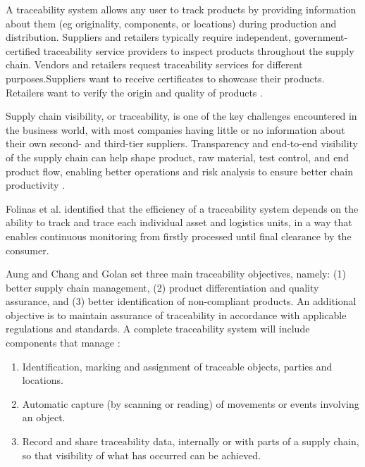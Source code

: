 A traceability system allows any user to track products by providing information about them (eg originality, components, or locations) during production and distribution. Suppliers and retailers typically require independent, government-certified traceability service providers to inspect products throughout the supply chain. Vendors and retailers request traceability services for different purposes.Suppliers want to receive certificates to showcase their products. Retailers want to verify the origin and quality of products \cite{lu2017adaptable}.

Supply chain visibility, or traceability, is one of the key challenges encountered in the business world, with most companies having little or no information about their own second- and third-tier suppliers. Transparency and end-to-end visibility of the supply chain can help shape product, raw material, test control, and end product flow, enabling better operations and risk analysis to ensure better chain productivity \cite{abeyratne2016blockchain}.

Folinas et al. \cite{folinas2006traceability} identified that the efficiency of a traceability system depends on the ability to track and trace each individual asset and logistics units, in a way that enables continuous monitoring from firstly processed until final clearance by the consumer.

Aung and Chang \cite{aung2014traceability} and Golan \cite{golan2004traceability} set three main traceability objectives, namely: (1) better supply chain management, (2) product differentiation and quality assurance, and (3) better identification of non-compliant products. An additional objective is to maintain assurance of traceability in accordance with applicable regulations and standards. A complete traceability system will include components that manage \cite{vargas2017trazabilidad}:

\begin{enumerate}
\item Identification, marking and assignment of traceable objects, parties and locations.
\item Automatic capture (by scanning or reading) of movements or events involving an object.
\item Record and share traceability data, internally or with parts of a supply chain, so that visibility of what has occurred can be achieved.
\end{enumerate}
